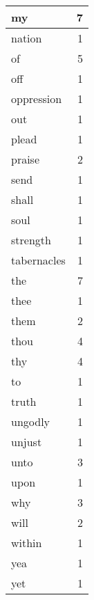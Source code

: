 \begin{center}
\begin{longtable}{l|r}
my & 7 \\ \hline
nation & 1 \\ \hline
of & 5 \\ \hline
off & 1 \\ \hline
oppression & 1 \\ \hline
out & 1 \\ \hline
plead & 1 \\ \hline
praise & 2 \\ \hline
send & 1 \\ \hline
shall & 1 \\ \hline
soul & 1 \\ \hline
strength & 1 \\ \hline
tabernacles & 1 \\ \hline
the & 7 \\ \hline
thee & 1 \\ \hline
them & 2 \\ \hline
thou & 4 \\ \hline
thy & 4 \\ \hline
to & 1 \\ \hline
truth & 1 \\ \hline
ungodly & 1 \\ \hline
unjust & 1 \\ \hline
unto & 3 \\ \hline
upon & 1 \\ \hline
why & 3 \\ \hline
will & 2 \\ \hline
within & 1 \\ \hline
yea & 1 \\ \hline
yet & 1 \\ \hline
\end{longtable}
\end{center}



\normalsize



